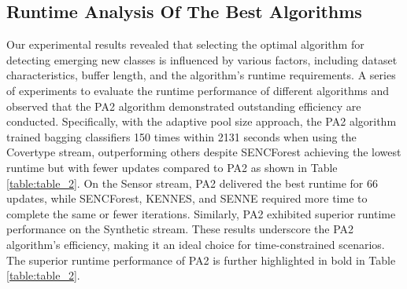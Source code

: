 \subsection{Runtime Analysis Of The Best Algorithms}
\label{sec:running}
Our experimental results revealed that selecting the optimal algorithm for detecting emerging new classes is influenced by various factors, including dataset characteristics, buffer length, and the algorithm's runtime requirements. A series of experiments to evaluate the runtime performance of different algorithms and observed that the PA2 algorithm demonstrated outstanding efficiency are conducted. Specifically, with the adaptive pool size approach, the PA2 algorithm trained bagging classifiers 150 times within 2131 seconds when using the Covertype stream, outperforming others despite SENCForest achieving the lowest runtime but with fewer updates compared to PA2 as shown in Table \ref{table:table_2}. On the Sensor stream, PA2 delivered the best runtime for 66 updates, while SENCForest, KENNES, and SENNE required more time to complete the same or fewer iterations. Similarly, PA2 exhibited superior runtime performance on the Synthetic stream. These results underscore the PA2 algorithm’s efficiency, making it an ideal choice for time-constrained scenarios. The superior runtime performance of PA2 is further highlighted in bold in Table \ref{table:table_2}.
	
